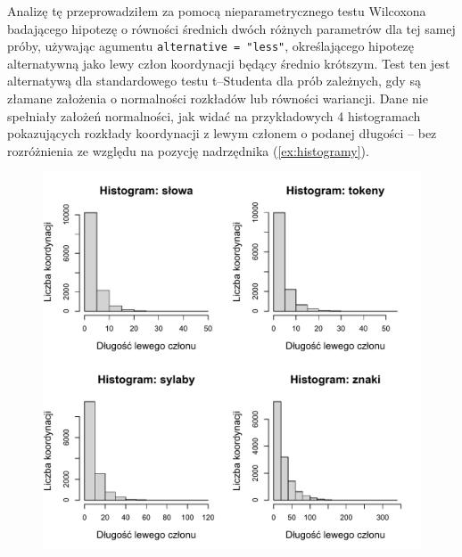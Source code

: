 \documentclass[licencjacka]{pracamgr_Kogni}
\begin{document}
Analizę tę przeprowadziłem za pomocą nieparametrycznego testu Wilcoxona badającego hipotezę o równości średnich dwóch różnych parametrów dla tej samej próby, używając agumentu \texttt{alternative = "less"}, określającego hipotezę alternatywną jako lewy człon koordynacji będący średnio krótszym. Test ten jest alternatywą dla standardowego testu t--Studenta dla prób zależnych, gdy są złamane założenia o normalności rozkładów lub równości wariancji. Dane nie spełniały założeń normalności, jak widać na przykładowych 4 histogramach pokazujących rozkłady koordynacji z lewym członem o podanej długości -- bez rozróżnienia ze względu na pozycję nadrzędnika (\ref{ex:histogramy}).
\newpage
\begin{exe}
    \ex\label{ex:histogramy}
\end{exe}
    \begin{figure}[H]
    \includegraphics[scale = 0.75]{../analizy/histogramy.pdf}
\end{figure}
\end{document}
